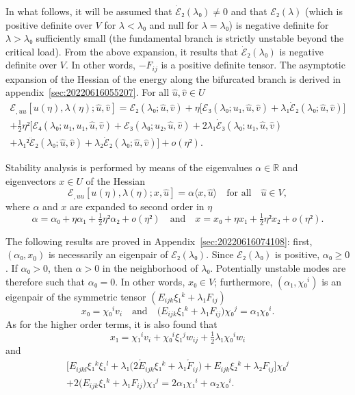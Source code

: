\documentclass[12pt, final]{scrartcl}
\theoremstyle{definition}
\newcommand{\reals}{\mathbb{R}}
\begin{document}
In what follows, it will be assumed that \(\dot{ℰ}₂(λ₀)≠0\) and that \(ℰ₂(λ)\)
(which is positive definite over \(V\) for \(λ<λ₀\) and null for \(λ=λ₀\)) is
negative definite for \(λ>λ₀\) sufficiently small (the fundamental branch is
strictly unstable beyond the critical load). From the above expansion, it
results that \(\dot{ℰ}₂(λ₀)\) is negative definite over \(V\). In other words,
\(-F_{ij}\) is a positive definite tensor. The asymptotic expansion of the
Hessian of the energy along the bifurcated branch is derived in
appendix~\ref{sec:20220616055207}. For all \(\hat{u}, \hat{v}∈U\)
\begin{multline}
  \label{eq:20220531054247}
  ℰ_{, uu}[u(η), λ(η); \hat{u}, \hat{v}] = ℰ₂(λ₀ ; \hat{u}, \hat{v}) + η \bigl[ℰ₃(λ₀ ; u₁, \hat{u}, \hat{v})  + λ₁ \dot{ℰ}₂(λ₀; \hat{u}, \hat{v})\bigr]\\
  + \tfrac{1}{2} η² \bigl[ℰ₄(λ₀; u₁, u₁, \hat{u}, \hat{v}) + ℰ₃(λ₀; u₂, \hat{u}, \hat{v}) + 2λ₁ \dot{ℰ}₃(λ₀; u₁, \hat{u}, \hat{v})\\
  + λ₁² \ddot{ℰ}₂(λ₀; \hat{u}, \hat{v}) + λ₂ \dot{ℰ}₂(λ₀; \hat{u}, \hat{v}) \bigr] + o(η²).
\end{multline}

Stability analysis is performed by means of the eigenvalues \(α ∈ \reals\) and
eigenvectors \(x ∈ U\) of the Hessian
\begin{equation}
  \label{eq:20220617074949}
  ℰ_{, u u} [u(η), λ(η); x, \hat{u}] = α 〈 x, \hat{u} 〉 \quad \text{for all} \quad \hat{u} ∈ V,
\end{equation}
where \(α\) and \(x\) are expanded to second order in \(η\)
\begin{equation}
  \label{eq:20220617064633}
  α = α₀ + η α₁ + \tfrac{1}{2} η² α₂ + o(η²)
  \quad \text{and} \quad
  x = x₀ + η x₁ + \tfrac{1}{2} η² x₂ + o(η²).
\end{equation}

The following results are proved in Appendix~\ref{sec:20220616074108}: first,
\((α₀, x_0)\) is necessarily an eigenpair of \(ℰ₂(λ₀)\). Since \(ℰ₂ (λ₀)\) is
positive, \(α₀ ≥ 0\). If \(α₀>0\), then \(α>0\) in the neighborhood of
\(λ₀\). Potentially unstable modes are therefore such that \(α₀=0\). In other
words, \(x₀ ∈ V\); furthermore, \((α₁, χ₀^i)\) is an eigenpair of the symmetric
tensor \((E_{ijk} ξ₁^k + λ₁ F_{ij})\)
\begin{equation}
  \label{eq:20220609133608}
  x₀ = χ₀^i v_i
  \quad \text{and} \quad
  \bigl(E_{ijk} ξ₁^k + λ₁ F_{ij} \bigr) χ₀^j = α₁ χ₀^i.
\end{equation}
As for the higher order terms, it is also found that
\begin{equation}
  \label{eq:20220609133629}
  x₁ = χ₁^i v_i +  χ₀^i ξ₁^j w_{i j} + \tfrac{1}{2} λ₁ χ₀^i w_i
\end{equation}
and
\begin{multline}
  \label{eq:20220616082923}
  \bigl[E_{ijkl} ξ₁^k ξ₁^l + λ₁\bigl(2 \mathring{E}_{ijk} ξ₁^k + λ₁ \mathring{F}_{ij}\bigr) + E_{ijk} ξ₂^k + λ₂ F_{ij} \bigr] χ₀^j\\
  + 2\bigl(E_{ijk}  ξ₁^k + λ₁ F_{ij} \bigr) χ₁^j = 2α₁χ₁^i + α₂ χ₀^i.
\end{multline}
\end{document}
